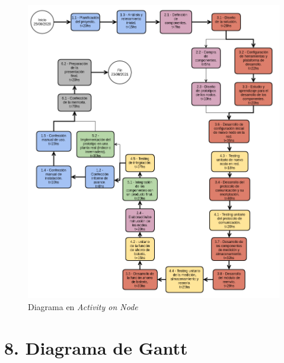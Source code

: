 \documentclass[11pt]{charter}
\begin{document}
\begin{figure}[htpb]
\centering 
\includegraphics[width=.9\textwidth]{./Figuras/aon.png}
\caption{Diagrama en \textit{Activity on Node}}
\label{fig:aon}
\end{figure}



\section{8. Diagrama de Gantt}
\label{sec:gantt}
\end{document}
